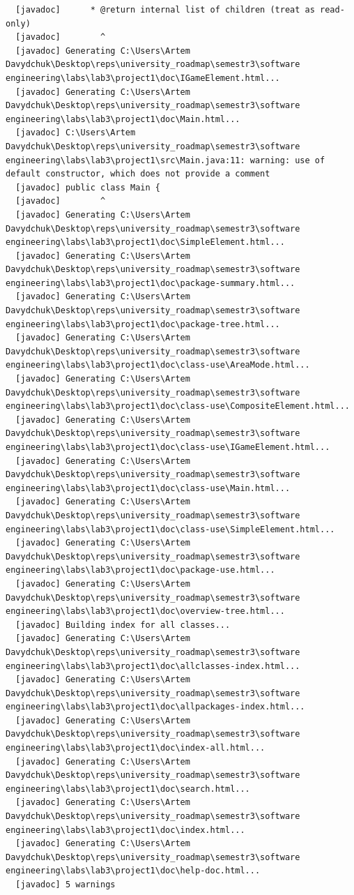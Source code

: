 \documentclass[12pt,a4paper]{article}
\begin{document}
\begin{verbatim}
  [javadoc]      * @return internal list of children (treat as read-only)
  [javadoc]        ^
  [javadoc] Generating C:\Users\Artem Davydchuk\Desktop\reps\university_roadmap\semestr3\software engineering\labs\lab3\project1\doc\IGameElement.html...
  [javadoc] Generating C:\Users\Artem Davydchuk\Desktop\reps\university_roadmap\semestr3\software engineering\labs\lab3\project1\doc\Main.html...
  [javadoc] C:\Users\Artem Davydchuk\Desktop\reps\university_roadmap\semestr3\software engineering\labs\lab3\project1\src\Main.java:11: warning: use of default constructor, which does not provide a comment
  [javadoc] public class Main {
  [javadoc]        ^
  [javadoc] Generating C:\Users\Artem Davydchuk\Desktop\reps\university_roadmap\semestr3\software engineering\labs\lab3\project1\doc\SimpleElement.html...
  [javadoc] Generating C:\Users\Artem Davydchuk\Desktop\reps\university_roadmap\semestr3\software engineering\labs\lab3\project1\doc\package-summary.html...
  [javadoc] Generating C:\Users\Artem Davydchuk\Desktop\reps\university_roadmap\semestr3\software engineering\labs\lab3\project1\doc\package-tree.html...
  [javadoc] Generating C:\Users\Artem Davydchuk\Desktop\reps\university_roadmap\semestr3\software engineering\labs\lab3\project1\doc\class-use\AreaMode.html...
  [javadoc] Generating C:\Users\Artem Davydchuk\Desktop\reps\university_roadmap\semestr3\software engineering\labs\lab3\project1\doc\class-use\CompositeElement.html...
  [javadoc] Generating C:\Users\Artem Davydchuk\Desktop\reps\university_roadmap\semestr3\software engineering\labs\lab3\project1\doc\class-use\IGameElement.html...
  [javadoc] Generating C:\Users\Artem Davydchuk\Desktop\reps\university_roadmap\semestr3\software engineering\labs\lab3\project1\doc\class-use\Main.html...
  [javadoc] Generating C:\Users\Artem Davydchuk\Desktop\reps\university_roadmap\semestr3\software engineering\labs\lab3\project1\doc\class-use\SimpleElement.html...
  [javadoc] Generating C:\Users\Artem Davydchuk\Desktop\reps\university_roadmap\semestr3\software engineering\labs\lab3\project1\doc\package-use.html...
  [javadoc] Generating C:\Users\Artem Davydchuk\Desktop\reps\university_roadmap\semestr3\software engineering\labs\lab3\project1\doc\overview-tree.html...
  [javadoc] Building index for all classes...
  [javadoc] Generating C:\Users\Artem Davydchuk\Desktop\reps\university_roadmap\semestr3\software engineering\labs\lab3\project1\doc\allclasses-index.html...
  [javadoc] Generating C:\Users\Artem Davydchuk\Desktop\reps\university_roadmap\semestr3\software engineering\labs\lab3\project1\doc\allpackages-index.html...
  [javadoc] Generating C:\Users\Artem Davydchuk\Desktop\reps\university_roadmap\semestr3\software engineering\labs\lab3\project1\doc\index-all.html...
  [javadoc] Generating C:\Users\Artem Davydchuk\Desktop\reps\university_roadmap\semestr3\software engineering\labs\lab3\project1\doc\search.html...
  [javadoc] Generating C:\Users\Artem Davydchuk\Desktop\reps\university_roadmap\semestr3\software engineering\labs\lab3\project1\doc\index.html...
  [javadoc] Generating C:\Users\Artem Davydchuk\Desktop\reps\university_roadmap\semestr3\software engineering\labs\lab3\project1\doc\help-doc.html...
  [javadoc] 5 warnings


\end{verbatim}
\end{document}
